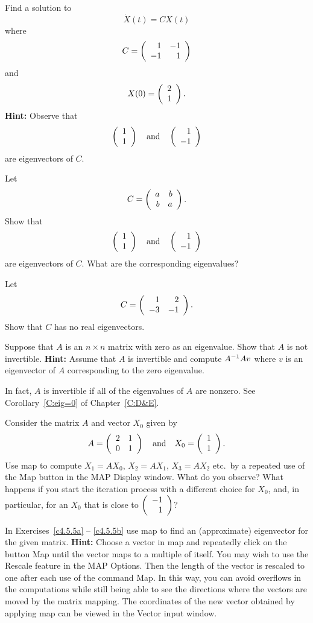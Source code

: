 \documentclass{ximera}
\begin{document}
\begin{exercise} \label{c4.5.2}
Find a solution to
\[
\dot{X}(t)=CX(t)
\]
where
\[
C=\left(\begin{array}{rr} 1 & -1\\ -1 &1\end{array}\right)
\]
and
\[
X(0)=\left(\begin{array}{r} 2 \\ 1\end{array}\right).
\]
{\bf Hint:} Observe that
\[
\left(\begin{array}{r} 1 \\ 1\end{array}\right) \quad\mbox{and}\quad \left(\begin{array}{r} 1 \\ -1\end{array}\right)
\]
are eigenvectors of $C$.
\end{exercise}

\begin{exercise} \label{c4.5.3}
Let
\[
C=\left(\begin{array}{rr} a & b\\ b &a\end{array}\right).
\]
Show that
\[
\left(\begin{array}{r} 1 \\ 1\end{array}\right) \quad\mbox{and}\quad \left(\begin{array}{r} 1 \\ -1\end{array}\right)
\]
are eigenvectors of $C$.  What are the corresponding eigenvalues?
\end{exercise}

\begin{exercise} \label{c4.5.4}
Let
\[
C=\left(\begin{array}{rr} 1 & 2\\ -3 &-1\end{array}\right).
\]
Show that $C$ has no real eigenvectors.
\end{exercise}

\begin{exercise}  \label{c4.9.6A}
Suppose that $A$ is an $n\times n$ matrix with zero as an eigenvalue.
Show that $A$ is not invertible.  {\bf Hint:}  Assume that $A$ is invertible 
and compute $A^{-1} Av$ where $v$ is an eigenvector of $A$ corresponding to 
the zero eigenvalue.
\end{exercise}
  In fact, $A$ is invertible if 
all of the eigenvalues of $A$ are nonzero.  See Corollary~\ref{C:eig=0} of 
Chapter~\ref{C:D&E}.


\CEXER

\begin{exercise} \label{c4.5.6}
Consider the matrix $A$ and vector $X_0$ given by
\[
A=\left(\begin{array}{rr} 2 & 1\\ 0 &1\end{array}\right)\quad\mbox{and}\quad X_0=\left(\begin{array}{r} 1 \\ 1\end{array}\right).
\]
Use {\sf map} to compute $X_1 = AX_0$, $X_2 = AX_1$, $X_3=AX_2$ etc.\ by a
repeated use of the {\sf Map} button in the {\sf MAP Display} window.  What
do you observe?  What happens if you start the iteration process with a
different choice for $X_0$, and, in particular, for an $X_0$ that is close
to $\left(\begin{array}{r} -1 \\ 1\end{array}\right)$?
\end{exercise}

\noindent In Exercises~\ref{c4.5.5a} -- \ref{c4.5.5b} use {\sf map} to find
an (approximate) eigenvector for the given matrix.  {\bf Hint:} Choose a
vector in {\sf map} and repeatedly click on the button {\sf Map} until the
vector maps to a multiple of itself.  You may wish to use the {\sf Rescale} 
feature in the {\sf MAP Options}.  Then the length of the vector is rescaled 
to one after each use of the command {\sf Map}. In this way, you can avoid
overflows in the computations while still being able to see the
directions where the vectors are moved by the matrix mapping.  The coordinates 
of the new vector obtained by applying {\sf map} can be viewed in the 
{\sf Vector input} window.
\end{document}
